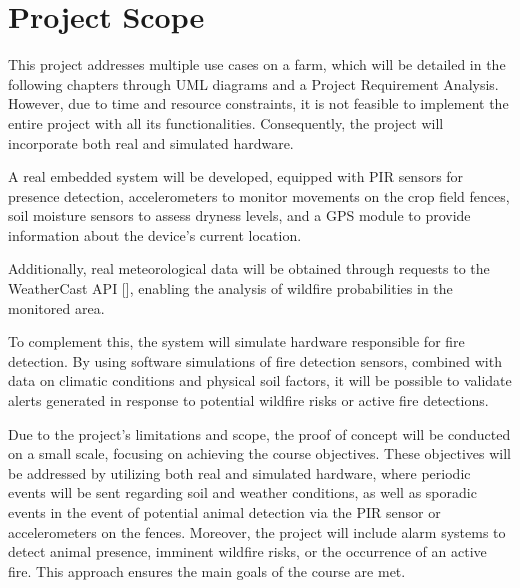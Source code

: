 \section{Project Scope}
This project addresses multiple use cases on a farm, which will be detailed in the following chapters through UML diagrams and a 
Project Requirement Analysis. However, due to time and resource constraints, it is not feasible to implement the entire project 
with all its functionalities. Consequently, the project will incorporate both real and simulated hardware.

A real embedded system will be developed, equipped with PIR sensors for presence detection, accelerometers to monitor movements on
the crop field fences, soil moisture sensors to assess dryness levels, and a GPS module to provide information about the device’s current location.

Additionally, real meteorological data will be obtained through requests to the WeatherCast API [], enabling the analysis of wildfire probabilities in the monitored area.

To complement this, the system will simulate hardware responsible for fire detection. By using software simulations of fire detection
sensors, combined with data on climatic conditions and physical soil factors, it will be possible to validate alerts generated in response
to potential wildfire risks or active fire detections.

Due to the project’s limitations and scope, the proof of concept will be conducted on a small scale, focusing on achieving the course objectives.
These objectives will be addressed by utilizing both real and simulated hardware, where periodic events will be sent regarding soil and weather conditions,
as well as sporadic events in the event of potential animal detection via the PIR sensor or accelerometers on the fences.  Moreover, the project will
include alarm systems to detect animal presence, imminent wildfire risks, or the occurrence of an active fire. This approach ensures the main goals of the course are met.


